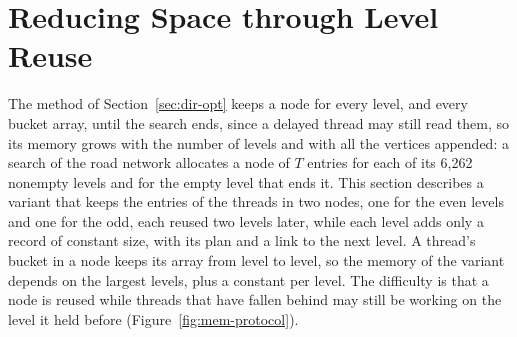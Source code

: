 \section{Reducing Space through Level Reuse}
\label{sec:variants}

The method of Section~\ref{sec:dir-opt} keeps a node for every level, and every bucket array, until the search ends, since a delayed thread may still read them, so its memory grows with the number of levels and with all the vertices appended: a search of the road network allocates a node of $T$ entries for each of its 6,262 nonempty levels and for the empty level that ends it. This section describes a variant that keeps the entries of the threads in two nodes, one for the even levels and one for the odd, each reused two levels later, while each level adds only a record of constant size, with its plan and a link to the next level. A thread's bucket in a node keeps its array from level to level, so the memory of the variant depends on the largest levels, plus a constant per level. The difficulty is that a node is reused while threads that have fallen behind may still be working on the level it held before (Figure~\ref{fig:mem-protocol}).

